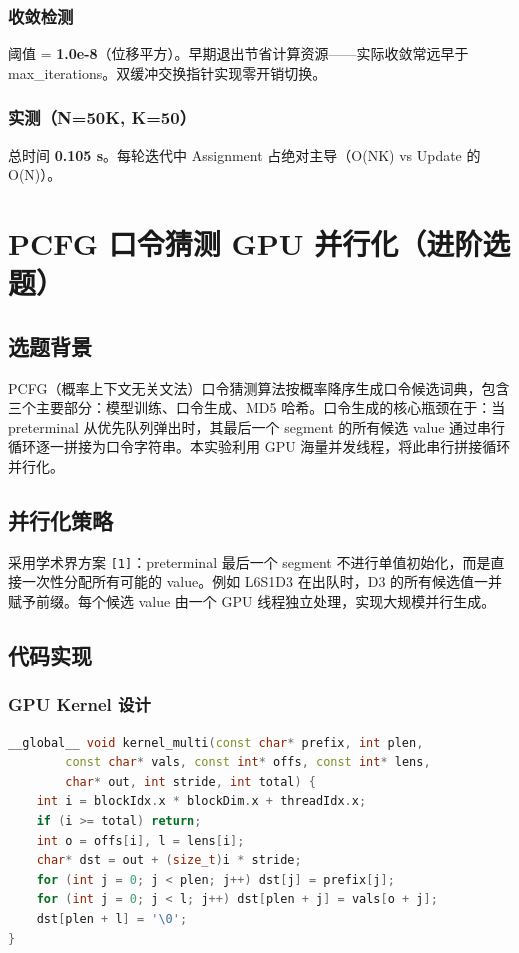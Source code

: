 \documentclass[12pt,a4paper]{article}
\newcommand{\ans}[1]{\textcolor{answerblue}{\textbf{#1}}}
\begin{document}
\subsubsection*{收敛检测}
阈值 = \ans{1.0e-8}（位移平方）。早期退出节省计算资源——实际收敛常远早于 max\_iterations。双缓冲交换指针实现零开销切换。

\subsubsection*{实测（N=50K, K=50）}
总时间 \ans{0.105 s}。每轮迭代中 Assignment 占绝对主导（O(NK) vs Update 的 O(N)）。

\section{PCFG 口令猜测 GPU 并行化（进阶选题）}

\subsection{选题背景}
PCFG（概率上下文无关文法）口令猜测算法按概率降序生成口令候选词典，包含三个主要部分：模型训练、口令生成、MD5 哈希。口令生成的核心瓶颈在于：当 preterminal 从优先队列弹出时，其最后一个 segment 的所有候选 value 通过串行循环逐一拼接为口令字符串。本实验利用 GPU 海量并发线程，将此串行拼接循环并行化。

\subsection{并行化策略}
采用学术界方案 \texttt{[1]}：preterminal 最后一个 segment 不进行单值初始化，而是直接一次性分配所有可能的 value。例如 L6S1D3 在出队时，D3 的所有候选值一并赋予前缀。每个候选 value 由一个 GPU 线程独立处理，实现大规模并行生成。

\subsection{代码实现}

\subsubsection*{GPU Kernel 设计}
\begin{lstlisting}[language=C++]
__global__ void kernel_multi(const char* prefix, int plen,
        const char* vals, const int* offs, const int* lens,
        char* out, int stride, int total) {
    int i = blockIdx.x * blockDim.x + threadIdx.x;
    if (i >= total) return;
    int o = offs[i], l = lens[i];
    char* dst = out + (size_t)i * stride;
    for (int j = 0; j < plen; j++) dst[j] = prefix[j];
    for (int j = 0; j < l; j++) dst[plen + j] = vals[o + j];
    dst[plen + l] = '\0';
}
\end{lstlisting}
\end{document}
